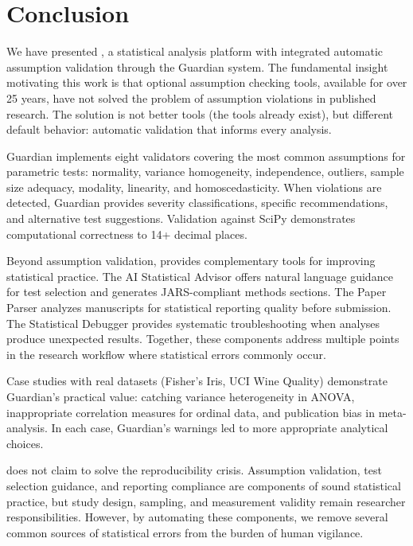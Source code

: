 \documentclass[article]{jss}
\begin{document}
\section{Conclusion} \label{sec:conclusion}

We have presented , a statistical analysis platform with integrated automatic assumption validation through the Guardian system. The fundamental insight motivating this work is that optional assumption checking tools, available for over 25 years, have not solved the problem of assumption violations in published research. The solution is not better tools (the tools already exist), but different default behavior: automatic validation that informs every analysis.

Guardian implements eight validators covering the most common assumptions for parametric tests: normality, variance homogeneity, independence, outliers, sample size adequacy, modality, linearity, and homoscedasticity. When violations are detected, Guardian provides severity classifications, specific recommendations, and alternative test suggestions. Validation against SciPy demonstrates computational correctness to 14+ decimal places.

Beyond assumption validation,  provides complementary tools for improving statistical practice. The AI Statistical Advisor offers natural language guidance for test selection and generates JARS-compliant methods sections. The Paper Parser analyzes manuscripts for statistical reporting quality before submission. The Statistical Debugger provides systematic troubleshooting when analyses produce unexpected results. Together, these components address multiple points in the research workflow where statistical errors commonly occur.

Case studies with real datasets (Fisher's Iris, UCI Wine Quality) demonstrate Guardian's practical value: catching variance heterogeneity in ANOVA, inappropriate correlation measures for ordinal data, and publication bias in meta-analysis. In each case, Guardian's warnings led to more appropriate analytical choices.

 does not claim to solve the reproducibility crisis. Assumption validation, test selection guidance, and reporting compliance are components of sound statistical practice, but study design, sampling, and measurement validity remain researcher responsibilities. However, by automating these components, we remove several common sources of statistical errors from the burden of human vigilance.
\end{document}
